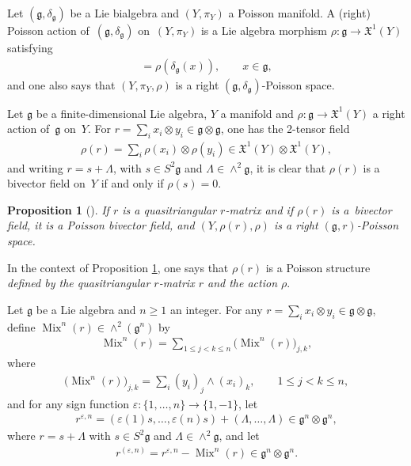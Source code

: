 \documentclass[pdftex]{sigma}
\numberwithin{equation}{section}
\newtheorem{Proposition}[Theorem]{Proposition}
{ \theoremstyle{definition}
\newtheorem{Definition}[Theorem]{Definition}
\newtheorem{Example}[Theorem]{Example}
\newtheorem{Remark}[Theorem]{Remark} }
\newcommand{\XX}{\mathfrak{X}}
\def \g {\mathfrak{a}}
\def \g {\mathfrak{g}}
\DeclareMathOperator{\Mix}{Mix}
\newcommand{\piY}{{\pi_{\scriptscriptstyle Y}}}
\begin{document}
Let $(\g, \delta_\g)$ be a Lie bialgebra and $(Y, \piY)$ a Poisson manifold. A (right) Poisson action of~$(\g, \delta_\g)$ on~$(Y, \piY)$ is a Lie algebra morphism $\rho\colon \g \to \XX^1(Y)$ satisfying
\begin{gather*}
[\rho(x), \piY] = \rho(\delta_\g(x)), \qquad x \in \g,
\end{gather*}
and one also says that $(Y, \piY, \rho)$ is a right $(\g, \delta_\g)$-Poisson space.

Let $\g$ be a f\/inite-dimensional Lie algebra, $Y$ a manifold and $\rho\colon \g \to \XX^1(Y)$ a right action of~$\g$ on~$Y$. For $r = \sum_i x_i \otimes y_i \in \g \otimes \g$, one has the 2-tensor f\/ield
\begin{gather*}
\rho(r) = \sum_i \rho(x_i) \otimes \rho(y_i) \in \XX^1(Y) \otimes \XX^1(Y),
\end{gather*}
and writing $r = s + \Lambda$, with $s \in S^2 \g$ and $\Lambda \in \wedge^2 \g$, it is clear that $\rho(r)$ is a bivector f\/ield on~$Y$ if and only if $\rho(s) = 0$.

\begin{Proposition}[{\cite[Proposition 2.18]{Lu-Mou:mixed}}]\label{Poi-def-r}
If $r$ is a quasitriangular $r$-matrix and if $\rho(r)$ is a~bivector field, it is a Poisson bivector field, and $(Y, \rho(r), \rho)$ is a right $(\g, r)$-Poisson space.
\end{Proposition}

In the context of Proposition \ref{Poi-def-r}, one says that $\rho(r)$ is a Poisson structure {\it def\/ined by the quasitriangular $r$-matrix $r$ and the action $\rho$}.

Let $\g$ be a Lie algebra and $n \geq 1$ an integer. For any $r = \sum_i x_i \otimes y_i \in \g \otimes \g$, def\/ine $\Mix^n(r) \in \wedge^2 (\g^n)$ by
\begin{gather}
\Mix^n(r) = \sum_{1 \leq j < k \leq n} \big( \Mix^n(r) \big)_{j,k}, \label{Mix^n(r)}
\end{gather}
where
\begin{gather*}
\big( \Mix^n(r) \big)_{j,k} = \sum_i (y_i)_j \wedge (x_i)_k, \qquad 1 \leq j < k \leq n,
\end{gather*}
and for any sign function $\varepsilon\colon \{1, \ldots, n\} \to \{1, -1\}$, let
\begin{gather*}
r^{\varepsilon, n} = (\varepsilon(1)s, \ldots, \varepsilon(n)s) + (\Lambda, \ldots, \Lambda) \in \g^n \otimes \g^n,
\end{gather*}
where $r = s + \Lambda$ with $s \in S^2\g$ and $\Lambda \in \wedge^2 \g$, and let
\begin{gather}
r^{(\varepsilon, n)} = r^{\varepsilon, n} - \Mix^n(r) \in \g^n \otimes \g^n. \label{defn-r^(n)}
\end{gather}
\end{document}
